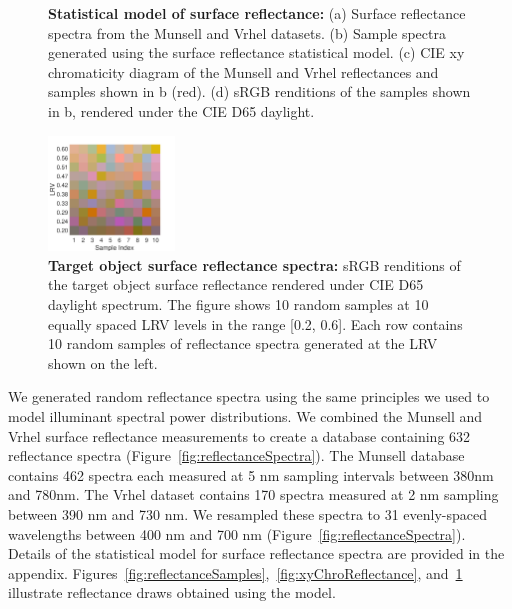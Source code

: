 \documentclass{jov}
\begin{document}
\begin{figure}
\begin{subfigure}{0.24 \textwidth}
        \label{fig:backgroundSwatches}
    \end{subfigure}
    \caption{{\bf Statistical model of surface reflectance:} (a) Surface reflectance spectra from the Munsell and Vrhel datasets. (b) Sample spectra generated using the surface reflectance statistical model. (c) CIE xy chromaticity diagram of the Munsell and Vrhel reflectances and samples shown in b (red). (d) sRGB renditions of the samples shown in b, rendered under the CIE D65 daylight.}
\label{fig:surfaceReflectanceGeneration}
\end{figure}

\begin{figure}
\centering
\includegraphics[width=0.3\textwidth]{../FiguresDraft4/Figure8/Figure8.pdf}
\caption{{\bf Target object surface reflectance spectra:} sRGB renditions of the target object surface reflectance rendered under CIE D65 daylight spectrum. The figure shows 10 random samples at 10 equally spaced LRV levels in the range [0.2, 0.6]. Each row contains 10 random samples of reflectance spectra generated at the LRV shown on the left.}
\label{fig:targetSwatches}
\end{figure}

We generated random reflectance spectra using the same principles we used to model illuminant spectral power distributions.
We combined the Munsell \cite{kelly1943tristimulus} and Vrhel \cite{vrhel1994measurement} surface reflectance 
measurements to create a database containing 632 reflectance spectra (Figure~\ref{fig:reflectanceSpectra}).
The Munsell database contains 462 spectra each measured at 5 nm sampling intervals between 380nm and 780nm.
The Vrhel dataset contains 170 spectra measured at 2 nm sampling between 390 nm and 730 nm.
We resampled these spectra to 31 evenly-spaced wavelengths between 400 nm and 700 nm (Figure~\ref{fig:reflectanceSpectra}).
Details of the statistical model for surface reflectance spectra are provided in the appendix. 
Figures~\ref{fig:reflectanceSamples},~\ref{fig:xyChroReflectance}, and~\ref{fig:backgroundSwatches} illustrate reflectance draws obtained using the model. 
\end{document}
